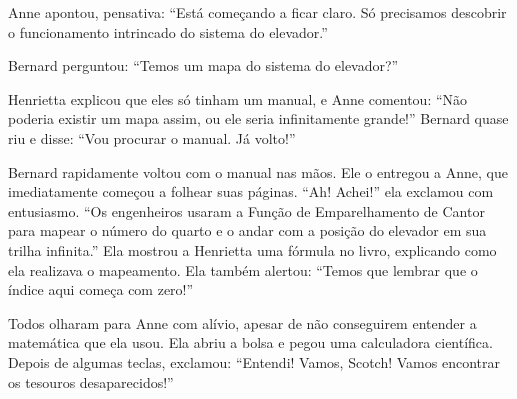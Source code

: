 Anne apontou, pensativa: ``Está começando a ficar claro. Só precisamos descobrir o funcionamento intrincado do sistema do elevador.''

Bernard perguntou: ``Temos um mapa do sistema do elevador?''

Henrietta explicou que eles só tinham um manual, e Anne comentou: ``Não poderia existir um mapa assim, ou ele seria infinitamente grande!'' Bernard quase riu e disse: ``Vou procurar o manual. Já volto!''

Bernard rapidamente voltou com o manual nas mãos. Ele o entregou a Anne, que imediatamente começou a folhear suas páginas. ``Ah! Achei!'' ela exclamou com entusiasmo. ``Os engenheiros usaram a Função de Emparelhamento de Cantor para mapear o número do quarto e o andar com a posição do elevador em sua trilha infinita.'' 
Ela mostrou a Henrietta uma fórmula no livro, explicando como ela realizava o mapeamento. %
Ela também alertou: ``Temos que lembrar que o índice aqui começa com zero!''

Todos olharam para Anne com alívio, apesar de não conseguirem entender a matemática que ela usou. Ela abriu a bolsa e pegou uma calculadora científica. Depois de algumas teclas, exclamou: ``Entendi! Vamos, Scotch! Vamos encontrar os tesouros desaparecidos!''
